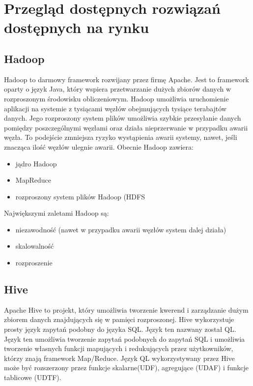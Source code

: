 \section{Przegląd dostępnych rozwiązań dostępnych na rynku}
\label{sec:solutions}

\subsection{Hadoop}
\label{sec:solutions:hadoop}
Hadoop to darmowy framework rozwijany przez firmę Apache. Jest to framework oparty o język Java, który wspiera przetwarzanie dużych zbiorów danych w rozproszonym środowisku obliczeniowym. Hadoop umożliwia uruchomienie aplikacji na systemie z tysiącami węzłów obejmujących tysiące terabajtów danych. Jego rozproszony system plików umożliwia szybkie przesyłanie danych pomiędzy poszczególnymi węzłami oraz działa nieprzerwanie w przypadku awarii węzła. To podejście zmniejsza ryzyko wystąpienia awarii systemy, nawet, jeśli znacząca ilość węzłów ulegnie awarii. Obecnie Hadoop zawiera:

\begin{itemize}[noitemsep]
\item jądro Hadoop
\item MapReduce
\item rozproszony system plików Hadoop (HDFS
\end{itemize}

Największymi zaletami Hadoop są:
\begin{itemize}[noitemsep]
\item niezawodność (nawet w przypadku awarii węzłów system dalej działa)
\item skalowalność
\item rozproszenie
\end{itemize}

\subsection{Hive}
\label{sec:solutions:hive}
Apache Hive to projekt, który umożliwia tworzenie kwerend i zarządzanie dużym zbiorem danych znajdujących się w pamięci rozproszonej. Hive wykorzystuje prosty język zapytań podobny do języka SQL. Język ten nazwany został QL. Język ten umożliwia tworzenie zapytań podobnych do zapytań SQL i umożliwia tworzenie własnych funkcji mapujących i redukujących przez użytkowników, którzy znają framework Map/Reduce. Język QL wykorzystywany przez Hive może być rozszerzony przez funkcje skalarne(UDF), agregujące (UDAF) i funkcje tablicowe (UDTF).

